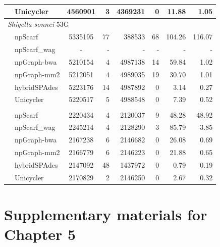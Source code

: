 \begin{longtable}[!hpt]{llcrrrrr}
\rowcolor{Gray}
& Unicycler & 4560901  & 3   &  4369231  &  0  & 11.88  & 1.05 \\
\hline
\multicolumn{8}{l}{\emph{Shigella sonnei} 53G} \\* %
\nobreakmidrule
& npScarf &  5335195 &  77  &  388533  &  68  & 104.26  &  116.07\\*
& npScarf\_wag & -  &  -  &  -  &  -  & -  &  -\\*
& npGraph-bwa & 5210154  &   4 &  4987138  & 14  & 59.84  &  1.02\\*
& npGraph-mm2 & 5212051  &  4  &   4989035 & 19  &  30.70 &  1.01\\*
& hybridSPAdes & 5223176  &  14  &  4987892  &  0  & 3.14  & 0.27\\*
& Unicycler &  5220517 &  5 &  4988548 & 0  & 7.39  &  0.52\\
\hline
\rowcolor{Gray}
\multicolumn{8}{l}{\emph{Streptococcus suis} BM407} \\* %
\nobreakmidrule
\rowcolor{Gray}
& npScarf &  2220434 & 4   &  2120037  &  9  & 48.28  & 48.92\\*
\rowcolor{Gray}
& npScarf\_wag & 2245214  &  4  &  2128290  &  3  & 85.79  & 3.85\\*
\rowcolor{Gray}
& npGraph-bwa & 2167238  &  6  &  2146682  &  0  & 26.08  & 0.69\\*
\rowcolor{Gray}
& npGraph-mm2 & 2166779  &  6  &  2146223  &  0  & 21.88  & 0.65\\*
\rowcolor{Gray}
& hybridSPAdes & 2147092  &  48  &  1437972  &  0  & 0.79  &  0.19\\*
\rowcolor{Gray}
& Unicycler &  2170829 &   2 &  2146250  &  0  &  2.67 & 0.32 \\
\hline
\end{longtable}


\chapter{Supplementary materials for Chapter 5}\label{app:concatemer}
\newpage

